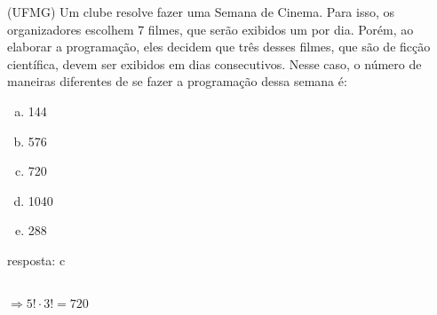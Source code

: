 \begin{ex}
  (UFMG) Um clube resolve fazer uma Semana de Cinema. Para isso, os organizadores escolhem 7 filmes, que serão exibidos um por dia. Porém, ao elaborar a programação, eles decidem que três desses filmes, que são de ficção científica, devem ser exibidos em dias consecutivos. Nesse caso, o número de maneiras diferentes de se fazer a programação dessa semana é: 
    \begin{enumerate}[(a)]
    \item 144
    \item 576
    \item 720
    \item 1040
    \item 288
    \end{enumerate}
      \begin{sol}
       resposta: c \\
         \\
         $\Longrightarrow5!\cdot3!=720$
      \end{sol}
\end{ex}